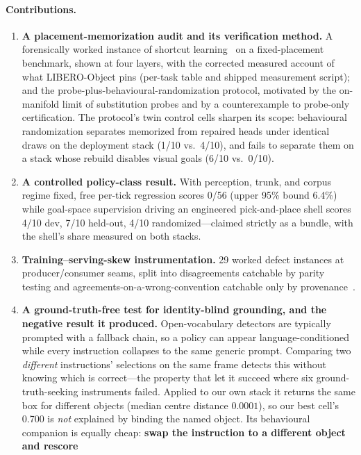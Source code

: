 \documentclass[10pt,letterpaper]{article}
\begin{document}
\paragraph{Contributions.}
\begin{enumerate}\itemsep2pt
\item \textbf{A placement-memorization audit and its verification method.}
A forensically worked instance of shortcut
learning~\citep{geirhos2020shortcut,dehaan2019causal} on a fixed-placement
benchmark, shown at four layers, with the corrected measured account of what
LIBERO-Object pins (per-task table and shipped measurement script); and the
probe-plus-behavioural-randomization protocol, motivated by the on-manifold
limit of substitution probes and by a counterexample to probe-only
certification. The protocol's twin control cells sharpen its scope:
behavioural randomization separates memorized from repaired heads under
identical draws on the deployment stack (1/10 vs.\ 4/10), and fails to
separate them on a stack whose rebuild disables visual goals (6/10 vs.\ 0/10).
\item \textbf{A controlled policy-class result.} With perception, trunk, and
corpus regime fixed, free per-tick regression scores 0/56 (upper 95\% bound
6.4\%) while goal-space supervision driving an engineered pick-and-place shell
scores 4/10 dev, 7/10 held-out, 4/10 randomized---claimed strictly as a bundle,
with the shell's share measured on both stacks.
\item \textbf{Training--serving-skew instrumentation.} 29 worked defect
instances at producer/consumer seams, split into disagreements catchable by
parity testing and agreements-on-a-wrong-convention catchable only by
provenance~\citep{sculley2015debt,breck2017mltest}.
\item \textbf{A ground-truth-free test for identity-blind grounding, and the
negative result it produced.} Open-vocabulary detectors are typically prompted
with a fallback chain, so a policy can appear language-conditioned while every
instruction collapses to the same generic prompt. Comparing two \emph{different}
instructions' selections on the same frame detects this without knowing which
is correct---the property that let it succeed where six ground-truth-seeking
instruments failed. Applied to our own stack it returns the same box for
different objects (median centre distance $0.0001$), so our best cell's 0.700 is
\emph{not} explained by binding the named object. Its behavioural companion is
equally cheap: \textbf{swap the instruction to a different object and rescore
}
\end{enumerate}
\end{document}
